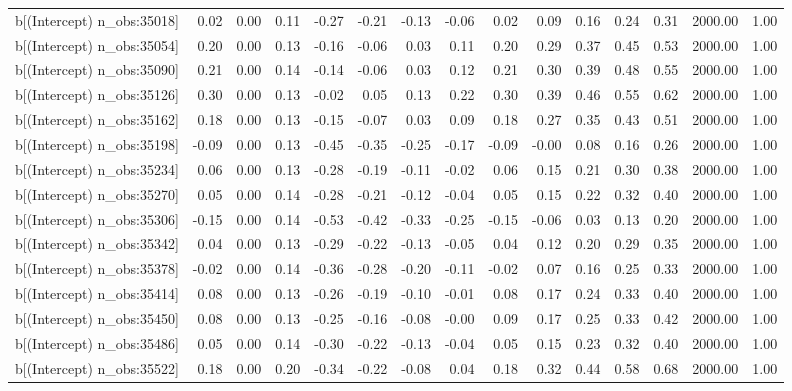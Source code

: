 \begin{table}[ht]
\begin{tabular}{rrrrrrrrrrrrrrr}
  b[(Intercept) n\_obs:35018] & 0.02 & 0.00 & 0.11 & -0.27 & -0.21 & -0.13 & -0.06 & 0.02 & 0.09 & 0.16 & 0.24 & 0.31 & 2000.00 & 1.00 \\ 
  b[(Intercept) n\_obs:35054] & 0.20 & 0.00 & 0.13 & -0.16 & -0.06 & 0.03 & 0.11 & 0.20 & 0.29 & 0.37 & 0.45 & 0.53 & 2000.00 & 1.00 \\ 
  b[(Intercept) n\_obs:35090] & 0.21 & 0.00 & 0.14 & -0.14 & -0.06 & 0.03 & 0.12 & 0.21 & 0.30 & 0.39 & 0.48 & 0.55 & 2000.00 & 1.00 \\ 
  b[(Intercept) n\_obs:35126] & 0.30 & 0.00 & 0.13 & -0.02 & 0.05 & 0.13 & 0.22 & 0.30 & 0.39 & 0.46 & 0.55 & 0.62 & 2000.00 & 1.00 \\ 
  b[(Intercept) n\_obs:35162] & 0.18 & 0.00 & 0.13 & -0.15 & -0.07 & 0.03 & 0.09 & 0.18 & 0.27 & 0.35 & 0.43 & 0.51 & 2000.00 & 1.00 \\ 
  b[(Intercept) n\_obs:35198] & -0.09 & 0.00 & 0.13 & -0.45 & -0.35 & -0.25 & -0.17 & -0.09 & -0.00 & 0.08 & 0.16 & 0.26 & 2000.00 & 1.00 \\ 
  b[(Intercept) n\_obs:35234] & 0.06 & 0.00 & 0.13 & -0.28 & -0.19 & -0.11 & -0.02 & 0.06 & 0.15 & 0.21 & 0.30 & 0.38 & 2000.00 & 1.00 \\ 
  b[(Intercept) n\_obs:35270] & 0.05 & 0.00 & 0.14 & -0.28 & -0.21 & -0.12 & -0.04 & 0.05 & 0.15 & 0.22 & 0.32 & 0.40 & 2000.00 & 1.00 \\ 
  b[(Intercept) n\_obs:35306] & -0.15 & 0.00 & 0.14 & -0.53 & -0.42 & -0.33 & -0.25 & -0.15 & -0.06 & 0.03 & 0.13 & 0.20 & 2000.00 & 1.00 \\ 
  b[(Intercept) n\_obs:35342] & 0.04 & 0.00 & 0.13 & -0.29 & -0.22 & -0.13 & -0.05 & 0.04 & 0.12 & 0.20 & 0.29 & 0.35 & 2000.00 & 1.00 \\ 
  b[(Intercept) n\_obs:35378] & -0.02 & 0.00 & 0.14 & -0.36 & -0.28 & -0.20 & -0.11 & -0.02 & 0.07 & 0.16 & 0.25 & 0.33 & 2000.00 & 1.00 \\ 
  b[(Intercept) n\_obs:35414] & 0.08 & 0.00 & 0.13 & -0.26 & -0.19 & -0.10 & -0.01 & 0.08 & 0.17 & 0.24 & 0.33 & 0.40 & 2000.00 & 1.00 \\ 
  b[(Intercept) n\_obs:35450] & 0.08 & 0.00 & 0.13 & -0.25 & -0.16 & -0.08 & -0.00 & 0.09 & 0.17 & 0.25 & 0.33 & 0.42 & 2000.00 & 1.00 \\ 
  b[(Intercept) n\_obs:35486] & 0.05 & 0.00 & 0.14 & -0.30 & -0.22 & -0.13 & -0.04 & 0.05 & 0.15 & 0.23 & 0.32 & 0.40 & 2000.00 & 1.00 \\ 
  b[(Intercept) n\_obs:35522] & 0.18 & 0.00 & 0.20 & -0.34 & -0.22 & -0.08 & 0.04 & 0.18 & 0.32 & 0.44 & 0.58 & 0.68 & 2000.00 & 1.00 \\ 

\end{tabular}
\end{table}
